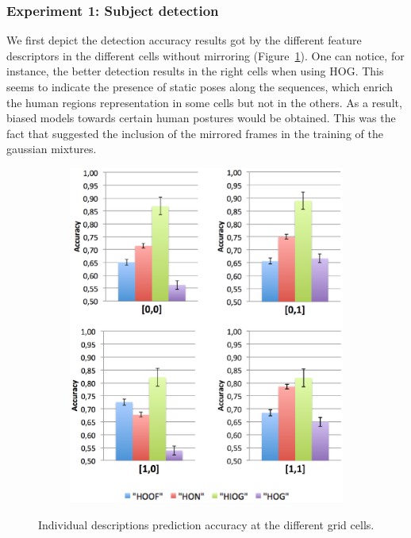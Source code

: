 \documentclass[10pt,twocolumn,letterpaper]{article}
\begin{document}


\subsubsection{Experiment 1: Subject detection}

We first depict the detection accuracy results got by the different feature descriptors in the different cells without mirroring (Figure~\ref{fig:descriptions_cells_prediction_accuracy}). One can notice, for instance, the better detection results in the right cells when using HOG. This seems to indicate the presence of static poses along the sequences, which enrich the human regions representation in some cells but not in the others. As a result, biased models towards certain human postures would be obtained. This was the fact that suggested the inclusion of the mirrored frames in the training of the gaussian mixtures.

\begin{figure}[ht]
\centering
\begin{subfigure}[b]{\columnwidth}
	\includegraphics[width=\columnwidth]{descriptions_cells_prediction_accuracy.eps}%
\end{subfigure}
\caption{Individual descriptions prediction accuracy at the different grid cells.}
\label{fig:descriptions_cells_prediction_accuracy}
\end{figure}
\end{document}
